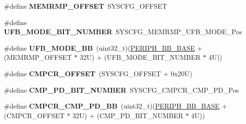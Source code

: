 \begin{DoxyCompactItemize}
\item 
\mbox{\label{group___h_a_l___private___constants_ga7f801653c361f31380f21357f92dc9af}} 
\#define {\bfseries M\+E\+M\+R\+M\+P\+\_\+\+O\+F\+F\+S\+ET}~S\+Y\+S\+C\+F\+G\+\_\+\+O\+F\+F\+S\+ET
\item 
\mbox{\label{group___h_a_l___private___constants_gac8a0079a8d30ec8633adaed9e2cfa49d}} 
\#define {\bfseries U\+F\+B\+\_\+\+M\+O\+D\+E\+\_\+\+B\+I\+T\+\_\+\+N\+U\+M\+B\+ER}~S\+Y\+S\+C\+F\+G\+\_\+\+M\+E\+M\+R\+M\+P\+\_\+\+U\+F\+B\+\_\+\+M\+O\+D\+E\+\_\+\+Pos
\item 
\mbox{\label{group___h_a_l___private___constants_ga96bde9109ea6ea0a7887658669ff9221}} 
\#define {\bfseries U\+F\+B\+\_\+\+M\+O\+D\+E\+\_\+\+BB}~(uint32\+\_\+t)(\mbox{\hyperlink{group___peripheral__memory__map_gaed7efc100877000845c236ccdc9e144a}{P\+E\+R\+I\+P\+H\+\_\+\+B\+B\+\_\+\+B\+A\+SE}} + (M\+E\+M\+R\+M\+P\+\_\+\+O\+F\+F\+S\+ET $\ast$ 32\+U) + (\+U\+F\+B\+\_\+\+M\+O\+D\+E\+\_\+\+B\+I\+T\+\_\+\+N\+U\+M\+B\+E\+R $\ast$ 4\+U))
\item 
\mbox{\label{group___h_a_l___private___constants_ga8e5fbe846e7478d522df749672b90084}} 
\#define {\bfseries C\+M\+P\+C\+R\+\_\+\+O\+F\+F\+S\+ET}~(S\+Y\+S\+C\+F\+G\+\_\+\+O\+F\+F\+S\+ET + 0x20\+U)
\item 
\mbox{\label{group___h_a_l___private___constants_ga9e34adb28e3eed088c55766f72d53183}} 
\#define {\bfseries C\+M\+P\+\_\+\+P\+D\+\_\+\+B\+I\+T\+\_\+\+N\+U\+M\+B\+ER}~S\+Y\+S\+C\+F\+G\+\_\+\+C\+M\+P\+C\+R\+\_\+\+C\+M\+P\+\_\+\+P\+D\+\_\+\+Pos
\item 
\mbox{\label{group___h_a_l___private___constants_gae4516ed27e02d84d9d20c7d711b87437}} 
\#define {\bfseries C\+M\+P\+C\+R\+\_\+\+C\+M\+P\+\_\+\+P\+D\+\_\+\+BB}~(uint32\+\_\+t)(\mbox{\hyperlink{group___peripheral__memory__map_gaed7efc100877000845c236ccdc9e144a}{P\+E\+R\+I\+P\+H\+\_\+\+B\+B\+\_\+\+B\+A\+SE}} + (C\+M\+P\+C\+R\+\_\+\+O\+F\+F\+S\+ET $\ast$ 32\+U) + (\+C\+M\+P\+\_\+\+P\+D\+\_\+\+B\+I\+T\+\_\+\+N\+U\+M\+B\+E\+R $\ast$ 4\+U))
\item 
\mbox{\label{group___h_a_l___private___constants_ga41f6d93357082d3177da0e85b872b6cf}} 

\end{DoxyCompactItemize}
